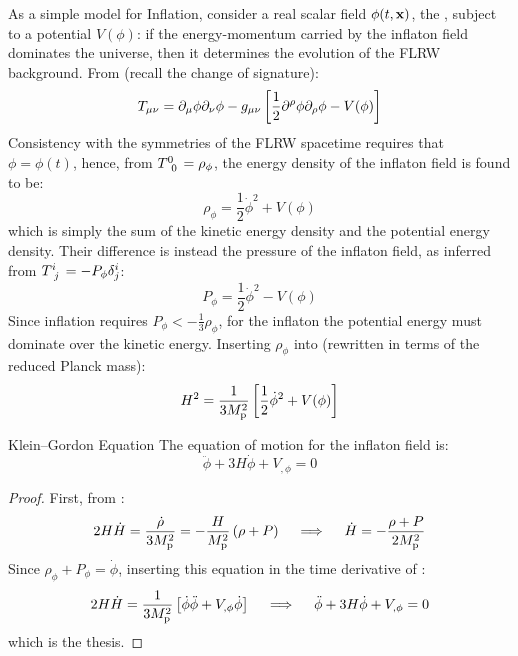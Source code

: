 As a simple model for Inflation, consider a real scalar field $ \phi(t,\mathbf{x}) $, the , subject to a potential $ V(\phi) $: if the energy-momentum carried by the inflaton field dominates the universe, then it determines the evolution of the FLRW background. From  (recall the change of signature):
\begin{equation*}
  T_{\mu \nu} = \partial_\mu \phi \partial_\nu \phi - g_{\mu \nu} \left[ \frac{1}{2} \partial^\rho \phi \partial_\rho \phi - V(\phi) \right]
\end{equation*}
Consistency with the symmetries of the FLRW spacetime requires that $ \phi = \phi(t) $, hence, from $ \tensor{T}{^0_0} = \rho_\phi $, the energy density of the inflaton field is found to be:
\begin{equation}
  \rho_\phi = \frac{1}{2} \dot{\phi}^2 + V(\phi)
\end{equation}
which is simply the sum of the kinetic energy density and the potential energy density. Their difference is instead the pressure of the inflaton field, as inferred from $ \tensor{T}{^i_j} = - P_\phi \delta^i_j $:
\begin{equation}
  P_\phi = \frac{1}{2} \dot{\phi}^2 - V(\phi)
\end{equation}
Since inflation requires $ P_\phi < - \frac{1}{3} \rho_\phi $, for the inflaton the potential energy must dominate over the kinetic energy. Inserting $ \rho_\phi $ into  (rewritten in terms of the reduced Planck mass\footnotemark):
\begin{equation}
  H^2 = \frac{1}{3M_\text{p}^2} \left[ \frac{1}{2} \dot{\phi}^2 + V(\phi) \right]
  \label{eq:inflaton-h2}
\end{equation}

\begin{proposition}{Klein--Gordon Equation}{}
  The equation of motion for the inflaton field is:
  \begin{equation}
    \ddot{\phi} + 3H \dot{\phi} + V_{,\phi} = 0
  \end{equation}
\end{proposition}

\begin{proofbox}
  \begin{proof}
    First, from :
    \begin{equation*}
      2H\dot{H} = \frac{\dot{\rho}}{3M_\text{p}^2} = - \frac{H}{M_\text{p}^2} \left( \rho + P \right)
      \quad \implies \quad
      \dot{H} = - \frac{\rho + P}{2M_\text{p}^2}
    \end{equation*}
    Since $ \rho_\phi + P_\phi = \dot{\phi} $, inserting this equation in the time derivative of :
    \begin{equation*}
      2H\dot{H} = \frac{1}{3M_\text{p}^2} \left[ \dot{\phi} \ddot{\phi} + V_{,\phi} \dot{\phi} \right]
      \quad \implies \quad
      \ddot{\phi} + 3H \dot{\phi} + V_{,\phi} = 0
    \end{equation*}
    which is the thesis.
  \end{proof}
\end{proofbox}

